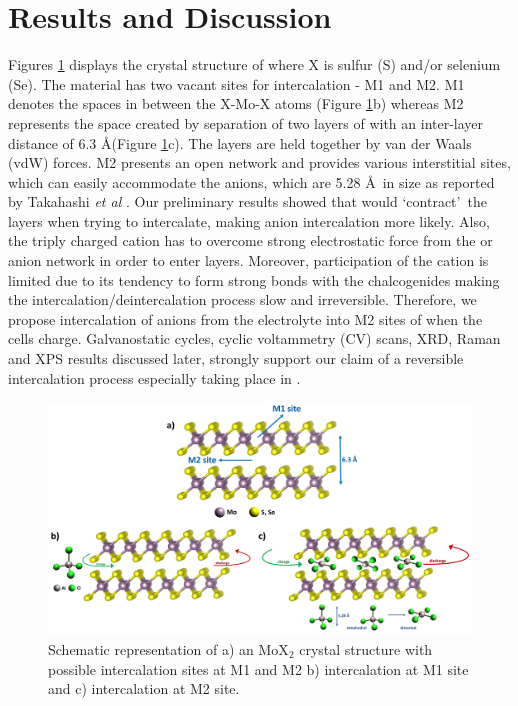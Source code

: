 \section{Results and Discussion}
Figures \ref{Figures/chap4fig:crys} displays the crystal structure of  where X is sulfur (S) and/or selenium (Se). The material has two vacant sites for intercalation - M1 and M2. M1 denotes the spaces in between the X-Mo-X atoms (Figure \ref{Figures/chap4fig:crys}b) whereas M2 represents the space created by separation of two layers of  with an inter-layer distance of 6.3 \AA (Figure \ref{Figures/chap4fig:crys}c). The layers are held together by van der Waals (vdW) forces. M2 presents an open network and provides various interstitial sites, which can easily accommodate the  anions, which are 5.28 \AA\ in size as reported by Takahashi {\it et al} \cite{takahashi_niv2o5nh2o_2005}. Our preliminary results showed that  would \lq contract\rq\ the  layers when trying to intercalate, making  anion intercalation more likely. Also, the triply charged  cation has to overcome strong electrostatic force from the  or  anion network in order to enter  layers. Moreover, participation of the cation is limited due to its tendency to form strong bonds with the chalcogenides making the intercalation/deintercalation process slow and irreversible. Therefore, we propose intercalation of  anions from the electrolyte into M2 sites of  when the cells charge. Galvanostatic cycles, cyclic voltammetry (CV) scans, XRD, Raman and XPS results discussed later, strongly support our claim of a reversible intercalation process especially taking place in  . 
\begin{figure}[htb!]
\centering
\includegraphics[width=\textwidth]{Figures/chap4fig/crys}
\caption{Schematic representation of a) an MoX$_2$ crystal structure with possible intercalation sites at M1 and M2 b) intercalation at M1 site and c) intercalation at M2 site.}
 \label{Figures/chap4fig:crys}
\end{figure}
